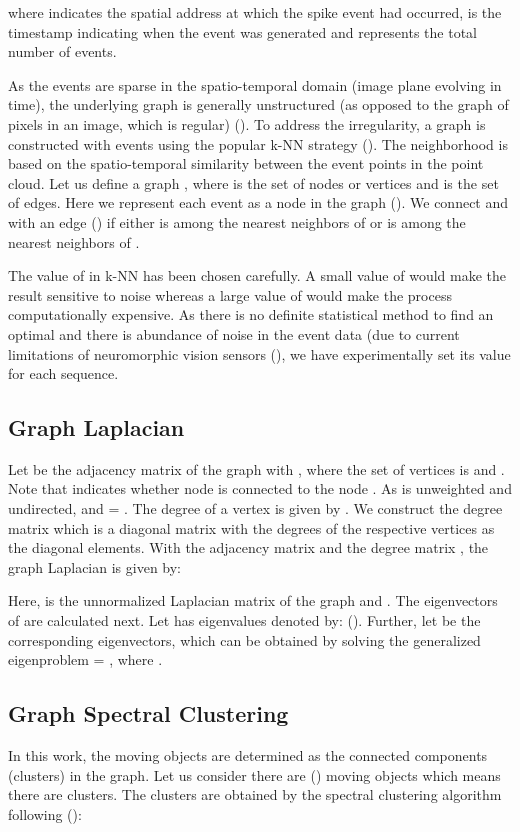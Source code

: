 \documentclass{article}
\begin{document}
where  indicates the spatial address at which the spike event had occurred,  is the timestamp indicating when the event was generated and  represents the total number of events. 

As the events are sparse in the spatio-temporal domain (image plane evolving in time), the underlying graph is generally unstructured (as opposed to the graph of pixels in an image, which is regular) (\cite{zhou2020event}). To address the irregularity, a graph is constructed with  events using the popular k-NN strategy (\cite{ortega2018graph}). The neighborhood is based on the spatio-temporal similarity between the event points in the point cloud. Let us define a graph , where   is the set of nodes or vertices and  is the set of edges. Here we represent each event  as a node  in the graph (). We connect  and  with an edge  () if either  is among the  nearest neighbors of  or  is among the  nearest neighbors of . 

The value of  in k-NN has been chosen carefully. A small value of  would make the result sensitive to noise whereas a large value of  would make the process computationally expensive. As there is no definite statistical method to find an optimal  and there is abundance of noise in the event data (due to current limitations of neuromorphic vision sensors (\cite{chen2018neuromorphic}), we have experimentally set its value for each sequence. 

\subsection{Graph Laplacian}
Let  be the adjacency matrix of the graph  with , where the set of vertices is  and . Note that  indicates whether node  is connected to the node . As  is unweighted and undirected,  and  = . The degree of a vertex  is given by . We construct the degree matrix  which is a diagonal matrix with the degrees  of the respective vertices  as the diagonal elements. With the adjacency matrix  and the degree matrix , the graph Laplacian  is given by: 


Here,  is the unnormalized Laplacian matrix of the graph  and . 
The eigenvectors of  are calculated next. Let  has  eigenvalues denoted by:  (\cite{von2007tutorial}). Further, let  be the corresponding eigenvectors, which can be obtained by solving the generalized eigenproblem  = , where . 

\subsection{Graph Spectral Clustering}
In this work, the moving objects are determined as the connected components (clusters) in the graph. Let us consider there are  () moving objects which means there are  clusters. The clusters are obtained by the spectral clustering algorithm following (\cite{shi2000normalized}):
\end{document}
